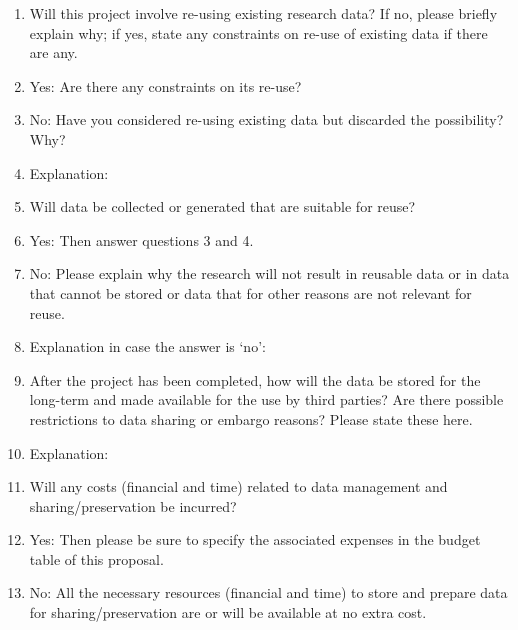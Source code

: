\begin{enumerate}
	\item Will this project involve re-using existing research data? If no, please briefly explain why; if yes, state any constraints on re-use of existing data if there are any.  
	\item[] \checkbox[1em] Yes: Are there any constraints on its re-use?
	\item[] \checkedbox[1em] No: Have you considered re-using existing data but discarded the possibility? Why?
	\vspace{6pt}
	\item[]Explanation:
	\vspace{6pt}
	
    \item Will data be collected or generated that are suitable for reuse?
    \item[] \checkedbox[1em] Yes: Then answer questions 3 and 4.
    \item[] \checkbox[1em] No: Please explain why the research will not result in reusable data or in data that cannot be stored or data that for other reasons are not relevant for reuse.
    \vspace{6pt}
    \item[]Explanation in case the answer is `no':
    \vspace{6pt}

    \item After the project has been completed, how will the data be stored for the long-term and made available for the use by third parties? Are there possible restrictions to data sharing or embargo reasons? Please state these here.
    \vspace{6pt}
    \item[] Explanation:
    \vspace{6pt}

    \item Will any costs (financial and time) related to data management and sharing/preservation be incurred?
	\item[] \checkbox[1em] Yes: Then please be sure to specify the associated expenses in the budget table of this proposal.
	\item[] \checkedbox[1em] No: All the necessary resources (financial and time) to store and prepare data for sharing/preservation are or will be available at no extra cost.
\end{enumerate}


